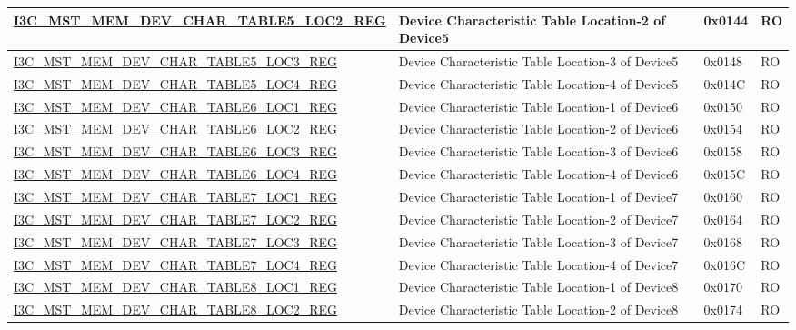 \begin{longtable}{ | p{8cm} | p{5.5cm} | p{1.3cm} | p{1cm} | }
\hyperref[regdesc:I3CMSTMEMDEVCHARTABLENLOCMREG]{I3C\_MST\_MEM\_DEV\_CHAR\_TABLE5\_LOC2\_REG} & Device Characteristic Table Location-2 of Device5 & 0x0144 & RO \\ \hline
\hyperref[regdesc:I3CMSTMEMDEVCHARTABLENLOCMREG]{I3C\_MST\_MEM\_DEV\_CHAR\_TABLE5\_LOC3\_REG} & Device Characteristic Table Location-3 of Device5 & 0x0148 & RO \\ \hline
\hyperref[regdesc:I3CMSTMEMDEVCHARTABLENLOCMREG]{I3C\_MST\_MEM\_DEV\_CHAR\_TABLE5\_LOC4\_REG} & Device Characteristic Table Location-4 of Device5 & 0x014C & RO \\ \hline
\hyperref[regdesc:I3CMSTMEMDEVCHARTABLENLOCMREG]{I3C\_MST\_MEM\_DEV\_CHAR\_TABLE6\_LOC1\_REG} & Device Characteristic Table Location-1 of Device6 & 0x0150 & RO \\ \hline
\hyperref[regdesc:I3CMSTMEMDEVCHARTABLENLOCMREG]{I3C\_MST\_MEM\_DEV\_CHAR\_TABLE6\_LOC2\_REG} & Device Characteristic Table Location-2 of Device6 & 0x0154 & RO \\ \hline
\hyperref[regdesc:I3CMSTMEMDEVCHARTABLENLOCMREG]{I3C\_MST\_MEM\_DEV\_CHAR\_TABLE6\_LOC3\_REG} & Device Characteristic Table Location-3 of Device6 & 0x0158 & RO \\ \hline
\hyperref[regdesc:I3CMSTMEMDEVCHARTABLENLOCMREG]{I3C\_MST\_MEM\_DEV\_CHAR\_TABLE6\_LOC4\_REG} & Device Characteristic Table Location-4 of Device6 & 0x015C & RO \\ \hline
\hyperref[regdesc:I3CMSTMEMDEVCHARTABLENLOCMREG]{I3C\_MST\_MEM\_DEV\_CHAR\_TABLE7\_LOC1\_REG} & Device Characteristic Table Location-1 of Device7 & 0x0160 & RO \\ \hline
\hyperref[regdesc:I3CMSTMEMDEVCHARTABLENLOCMREG]{I3C\_MST\_MEM\_DEV\_CHAR\_TABLE7\_LOC2\_REG} & Device Characteristic Table Location-2 of Device7 & 0x0164 & RO \\ \hline
\hyperref[regdesc:I3CMSTMEMDEVCHARTABLENLOCMREG]{I3C\_MST\_MEM\_DEV\_CHAR\_TABLE7\_LOC3\_REG} & Device Characteristic Table Location-3 of Device7 & 0x0168 & RO \\ \hline
\hyperref[regdesc:I3CMSTMEMDEVCHARTABLENLOCMREG]{I3C\_MST\_MEM\_DEV\_CHAR\_TABLE7\_LOC4\_REG} & Device Characteristic Table Location-4 of Device7 & 0x016C & RO \\ \hline
\hyperref[regdesc:I3CMSTMEMDEVCHARTABLENLOCMREG]{I3C\_MST\_MEM\_DEV\_CHAR\_TABLE8\_LOC1\_REG} & Device Characteristic Table Location-1 of Device8 & 0x0170 & RO \\ \hline
\hyperref[regdesc:I3CMSTMEMDEVCHARTABLENLOCMREG]{I3C\_MST\_MEM\_DEV\_CHAR\_TABLE8\_LOC2\_REG} & Device Characteristic Table Location-2 of Device8 & 0x0174 & RO \\ \hline

\end{longtable}
